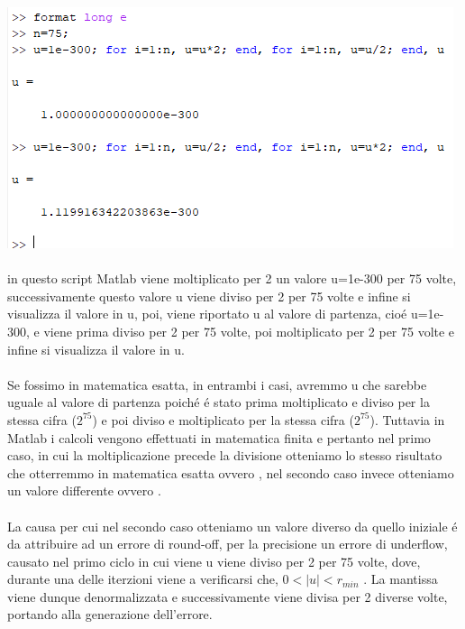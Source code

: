\includegraphics[width=1\linewidth]{img/ex3}
\\~\\
\noindent  in questo script Matlab viene moltiplicato per 2 un valore u=1e-300 per 75 volte, successivamente questo valore u viene diviso per 2 per 75 volte e infine si visualizza il valore in u, poi, viene riportato u al valore di partenza, cio\'e u=1e-300, e viene prima diviso per 2 per 75 volte, poi moltiplicato per 2 per 75 volte  e infine si visualizza il valore in u.
\\~\\
\noindent Se fossimo in matematica esatta, in entrambi i casi, avremmo u che sarebbe uguale al valore di partenza poich\'e \'e stato prima moltiplicato e diviso per la stessa cifra ($2^{75}$) e poi diviso e moltiplicato per la stessa cifra ($2^{75}$). Tuttavia in Matlab i calcoli vengono effettuati in matematica finita e pertanto nel primo caso, in cui la moltiplicazione precede la divisione otteniamo lo stesso risultato che otterremmo in matematica esatta ovvero , nel secondo caso invece otteniamo un valore differente ovvero .
\\~\\
\noindent La causa per cui nel secondo caso otteniamo un valore diverso da quello iniziale \'e da attribuire ad un errore di round-off, per la precisione un errore di underflow, causato nel primo ciclo in cui viene u viene diviso per 2 per 75 volte, dove, durante una delle iterzioni viene a verificarsi che, $0 < \left | u \right |< r_{min}$ . La mantissa viene dunque denormalizzata e successivamente viene divisa per 2 diverse volte, portando alla generazione dell'errore.
\newline
\newline